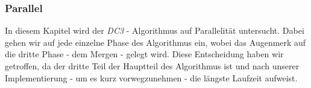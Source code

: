 \subsubsection{Parallel}
\label{dc3-parallel}

In  diesem Kapitel wird der \emph{DC3} - Algorithmus auf Parallelität untersucht. Dabei gehen wir auf jede einzelne Phase des Algorithmus ein, wobei das Augenmerk auf die dritte Phase - dem Mergen - gelegt wird. Diese Entscheidung haben wir getroffen, da der dritte Teil der Hauptteil des Algorithmus ist und nach unserer Implementierung - um es kurz vorwegzunehmen - die längste Laufzeit aufweist.




